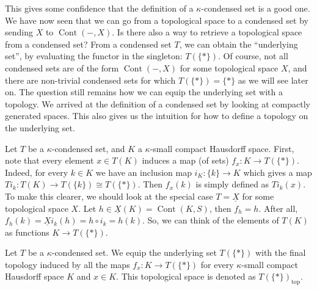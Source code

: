 \documentclass{article}
\DeclareMathOperator{\Cont}{Cont}
\renewcommand{\top}{\textrm{top}}
\begin{document}
This gives some confidence that the definition of a $\kappa$-condensed set
is a good one. We have now seen that we can go from a topological space
to a condensed set by sending $X$ to $\Cont(- ,X)$. Is there also a way
to retrieve a topological space from a condensed set?
From a condensed set $T$, we can obtain the ``underlying set'', by evaluating
the functor in the singleton: $T(\{*\})$. Of course, not all condensed sets
are of the form $\Cont(-, X)$ for some topological space $X$, and there are
non-trivial condensed sets for which $T(\{*\}) = \{*\}$ as we will
see later on. The question still remains how we can equip the underlying
set with a topology. We arrived at the definition of a
condensed set by looking at compactly
generated spaces. This also gives us the intuition for how to
define a topology on the underlying set.

Let $T$ be a $\kappa$-condensed
set, and $K$ a $\kappa$-small compact Hausdorff space. First, note that every
element $x \in T(K)$ induces a map (of sets) $f_x \colon K \to T(\{*\})$. Indeed,
for every $k\in K$ we have an inclusion map $i_K \colon \{k\} \to K$
which gives a map $Ti_k \colon T(K) \to T(\{k\}) \cong T(\{*\})$. Then
$f_x(k)$ is simply defined as $Ti_k(x)$. To make this clearer, we should
look at the special case $T = \underline{X}$ for some topological space
$X$. Let $h\in \underline{X}(K) = \Cont(K , S)$, then $f_h = h$.
After all, $f_h(k) = \underline{X}i_k(h) = h\circ i_k = h(k)$.
So, we can think of the elements of $T(K)$ as functions $K \to T(\{*\})$.
\begin{definition}
    Let $T$ be a $\kappa$-condensed set. We equip the underlying set $T(\{*\})$
    with the final topology induced by all the maps $f_x \colon K \to T(\{*\})$
    for every $\kappa$-small compact Hausdorff space $K$ and $x\in K$.
    This topological space is denoted as $T(\{*\})_\top$.
\end{definition}
\end{document}
